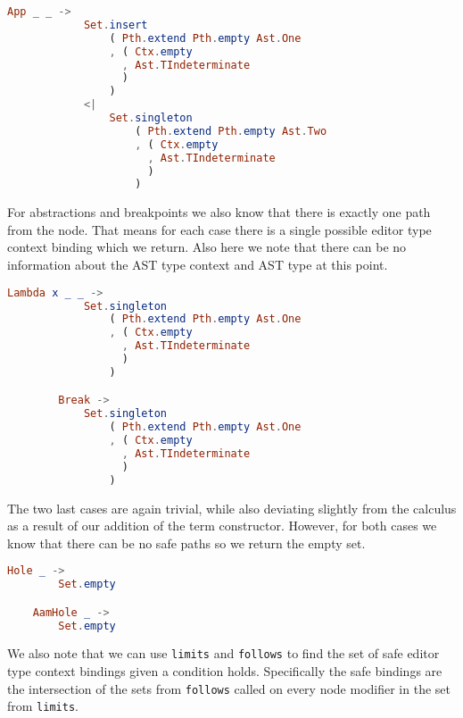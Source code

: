 \begin{lstlisting}[language=elm,%
    gobble=8,%
    ]
        App _ _ ->
            Set.insert
                ( Pth.extend Pth.empty Ast.One
                , ( Ctx.empty
                  , Ast.TIndeterminate
                  )
                )
            <|
                Set.singleton
                    ( Pth.extend Pth.empty Ast.Two
                    , ( Ctx.empty
                      , Ast.TIndeterminate
                      )
                    )
\end{lstlisting}
For abstractions and breakpoints we also know that there is exactly one path
from the node. That means for each case there is a single possible editor type
context binding which we return. Also here we note that there can be no
information about the AST type context and AST type at this point.
\begin{lstlisting}[language=elm,%
    gobble=8,%
    ]
        Lambda x _ _ ->
            Set.singleton
                ( Pth.extend Pth.empty Ast.One
                , ( Ctx.empty
                  , Ast.TIndeterminate
                  )
                )

        Break ->
            Set.singleton
                ( Pth.extend Pth.empty Ast.One
                , ( Ctx.empty
                  , Ast.TIndeterminate
                  )
                )
\end{lstlisting}
The two last cases are again trivial, while also deviating slightly from the
calculus as a result of our addition of the  term constructor.
However, for both cases we know that there can be no safe paths so we return
the empty set.
\begin{lstlisting}[language=elm,%
    gobble=4,%
    ]
    Hole _ ->
        Set.empty

    AamHole _ ->
        Set.empty
\end{lstlisting}

We also note that we can use \texttt{limits} and \texttt{follows} to find the
set of safe editor type context bindings given a condition holds. Specifically
the safe bindings are the intersection of the sets from \texttt{follows} called
on every node modifier in the set from \texttt{limits}.\\

